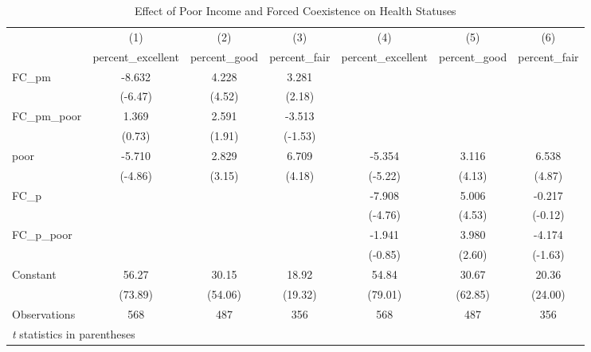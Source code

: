 \documentclass[12pt]{article}
\begin{document}
\begin{table}[htbp]\centering \caption{Effect of Poor Income and Forced Coexistence on Health Statuses\label{poorfc}} \begin{tabular}{l*{6}{c}} \toprule
                    &\multicolumn{1}{c}{(1)}&\multicolumn{1}{c}{(2)}&\multicolumn{1}{c}{(3)}&\multicolumn{1}{c}{(4)}&\multicolumn{1}{c}{(5)}&\multicolumn{1}{c}{(6)}\\
                    &\multicolumn{1}{c}{percent\_excellent}&\multicolumn{1}{c}{percent\_good}&\multicolumn{1}{c}{percent\_fair}&\multicolumn{1}{c}{percent\_excellent}&\multicolumn{1}{c}{percent\_good}&\multicolumn{1}{c}{percent\_fair}\\
\midrule
FC\_pm           &      -8.632&       4.228&       3.281&            &            &            \\
                    &     (-6.47)&      (4.52)&      (2.18)&            &            &            \\
\addlinespace
FC\_pm\_poor      &       1.369&       2.591&      -3.513&            &            &            \\
                    &      (0.73)&      (1.91)&     (-1.53)&            &            &            \\
\addlinespace
poor         &      -5.710&       2.829&       6.709&      -5.354&       3.116&       6.538\\
                    &     (-4.86)&      (3.15)&      (4.18)&     (-5.22)&      (4.13)&      (4.87)\\
\addlinespace
FC\_p            &            &            &            &      -7.908&       5.006&      -0.217\\
                    &            &            &            &     (-4.76)&      (4.53)&     (-0.12)\\
\addlinespace
FC\_p\_poor       &            &            &            &      -1.941&       3.980&      -4.174\\
                    &            &            &            &     (-0.85)&      (2.60)&     (-1.63)\\
\addlinespace
Constant            &       56.27&       30.15&       18.92&       54.84&       30.67&       20.36\\
                    &     (73.89)&     (54.06)&     (19.32)&     (79.01)&     (62.85)&     (24.00)\\
\midrule
Observations        &         568&         487&         356&         568&         487&         356\\
\bottomrule
\multicolumn{7}{l}{\footnotesize \textit{t} statistics in parentheses}\\
\end{tabular}
\end{table}
\end{document}
